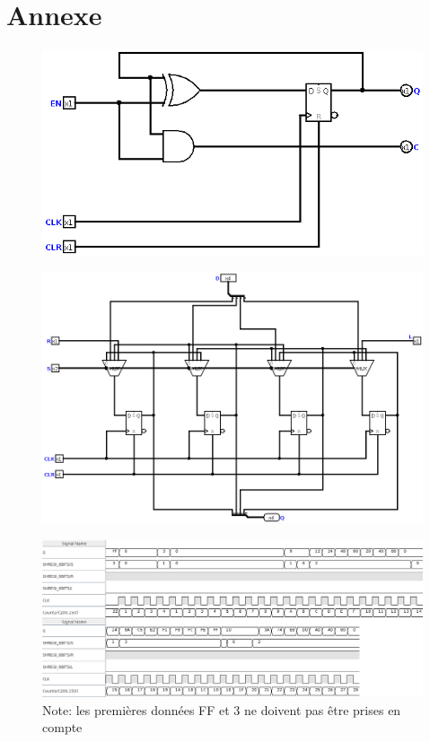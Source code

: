 \documentclass[a4paper]{article} %
\begin{document}
\section{Annexe}


\begin{figure}[H]
\centering
    \includegraphics[width=1\textwidth]{src/COUNT_BASE.png}
    \label{fig:countBase}
\end{figure}

\begin{figure}[H]
\centering
    \includegraphics[width=1\textwidth]{src/SHREGI_4BITS.png}
    \label{fig:shregi4}
\end{figure}

\begin{figure}[H]
\centering
    \includegraphics[width=1\textwidth]{src/chrono_SHREG_8BITS.png}
    \label{fig:chrono_shregi8}
    Note: les premières données FF et 3 ne doivent pas être prises en compte
\end{figure}
\end{document}
